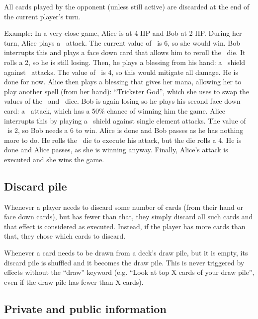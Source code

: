 \documentclass[dvipsnames,parskip,a4paper]{scrartcl}
\newcommand{\iconsize}{3.4mm}
\newcommand{\icondepth}{0.45mm}
\newcommand{\icon}[1]{\raisebox{-\icondepth}{\texttt{[image:  \#1 ]}}}
\newcommand{\fire}{\icon{icons/fire.png}}
\newcommand{\water}{\icon{icons/water.png}}
\newcommand{\gold}{\icon{icons/gold.png}}
\newcommand{\chance}{\icon{icons/chance.png}}
\begin{document}
All cards played by the opponent (unless still active) are discarded at the end of the current player's turn.

\vspace{4pt}

Example: In a very close game, Alice is at 4 HP and Bob at 2 HP. During her turn, Alice plays a \fire \ attack. The current value of \fire \ is 6, so she would win. Bob interrupts this and plays a face down card that allows him to reroll the \fire \ die. It rolls a 2, so he is still losing. Then, he plays a blessing from his hand: a \water \ shield against \fire \ attacks. The value of \water \ is 4, so this would mitigate all damage. He is done for now. Alice then plays a blessing that gives her mana, allowing her to play another spell (from her hand): ``Trickster God'', which she uses to swap the values of the \fire \ and \water \ dice. Bob is again losing so he plays his second face down card: a \chance \ attack, which has a 50\% chance of winning him the game. Alice interrupts this by playing a \gold \ shield against single element attacks. The value of \gold \ is 2, so Bob needs a 6 to win. Alice is done and Bob passes as he has nothing more to do. He rolls the \chace \ die to execute his attack, but the die rolls a 4. He is done and Alice passes, as she is winning anyway. Finally, Alice's attack is executed and she wins the game.

\subsection*{Discard pile}

Whenever a player needs to discard some number of cards (from their hand or face down cards), but has fewer than that, they simply discard all such cards and that effect is considered as executed. Instead, if the player has more cards than that, they chose which cards to discard.

\vspace*{4pt}

Whenever a card needs to be drawn from a deck's draw pile, but it is empty, its discard pile is shuffled and it becomes the draw pile. This is never triggered by effects without the ``draw'' keyword (e.g. ``Look at top X cards of your draw pile'', even if the draw pile has fewer than X cards).

\subsection*{Private and public information}
\end{document}
